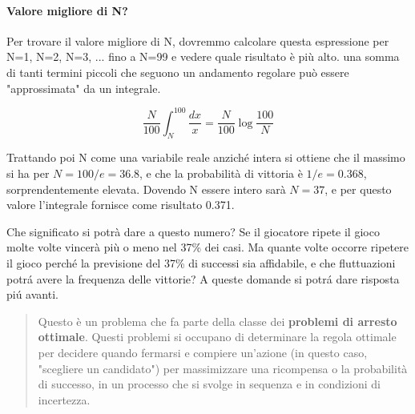 \paragraph{Valore migliore di N?}
Per trovare il valore migliore di N, dovremmo calcolare questa espressione per N=1, N=2, N=3, ... fino a N=99 e vedere quale risultato è più alto.
una somma di tanti termini piccoli che seguono un andamento regolare può essere "approssimata" da un integrale.

\begin{equation}
\frac{N}{100} \int_{N}^{100} \frac{dx}{x} = \frac{N}{100} \log \frac{100}{N} \tag{1.2}
\end{equation}

Trattando poi N come una variabile reale anziché intera si ottiene che il massimo si ha per $N = 100/e = 36.8$, e che la probabilità di vittoria è $1/e = 0.368$, sorprendentemente elevata. Dovendo N essere intero sarà $N = 37$, e per questo valore l'integrale fornisce come risultato 0.371.

Che significato si potrà dare a questo numero? Se il giocatore ripete il gioco molte volte vincerà più o meno nel 37\% dei casi. Ma quante volte occorre ripetere il gioco perché la previsione del 37\% di successi sia affidabile, e che fluttuazioni potrá avere la frequenza delle
vittorie? A queste domande si potrá dare risposta piú avanti.

\begin{quote}
Questo è un problema che fa parte della classe dei \textbf{problemi di arresto ottimale}. Questi problemi si occupano di determinare la regola ottimale per decidere quando fermarsi e compiere un'azione (in questo caso, "scegliere un candidato") per massimizzare una ricompensa o la probabilità di successo, in un processo che si svolge in sequenza e in condizioni di incertezza.
\end{quote}


